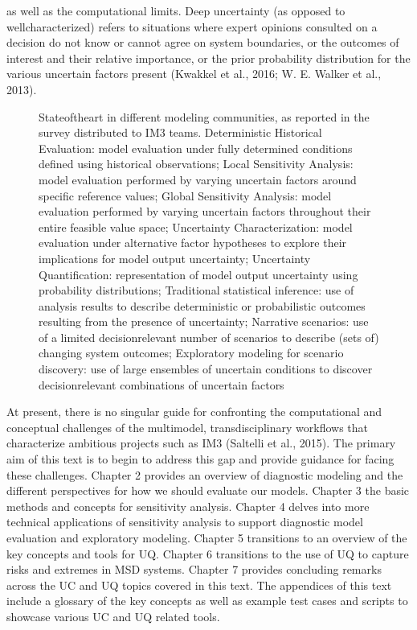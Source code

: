 \documentclass[letterpaper,10pt,english]{sphinxmanual}
\let\sphinxpxdimen\pdfpxdimen\else\newdimen\sphinxpxdimen
\begin{document}
as well as the computational limits. Deep uncertainty (as opposed to well\sphinxhyphen{}characterized) refers to situations where expert opinions consulted on a decision do not know or cannot agree on system boundaries, or the outcomes of interest and their relative importance, or the prior probability distribution for the various uncertain factors present (Kwakkel et al., 2016; W. E. Walker et al., 2013).

\begin{figure}[htbp]
\centering
\capstart

\noindent\sphinxincludegraphics[width=700\sphinxpxdimen]{{figure1_state_of_the_science}.png}
\caption{State\sphinxhyphen{}of\sphinxhyphen{}the\sphinxhyphen{}art in different modeling communities, as reported in the survey distributed to IM3 teams. Deterministic Historical Evaluation: model evaluation under fully determined conditions defined using historical observations; Local Sensitivity Analysis: model evaluation performed by varying uncertain factors around specific reference values; Global Sensitivity Analysis: model evaluation performed by varying uncertain factors throughout their entire feasible value space; Uncertainty Characterization: model evaluation under alternative factor hypotheses to explore their implications for model output uncertainty; Uncertainty Quantification: representation of model output uncertainty using probability distributions; Traditional statistical inference: use of analysis results to describe deterministic or probabilistic outcomes resulting from the presence of uncertainty; Narrative scenarios: use of a limited decision\sphinxhyphen{}relevant number of scenarios to describe (sets of) changing system outcomes; Exploratory modeling for scenario discovery: use of large ensembles of uncertain conditions to discover decision\sphinxhyphen{}relevant combinations of uncertain factors}\label{\detokenize{1_introduction:id1}}\end{figure}

\sphinxAtStartPar
At present, there is no singular guide for confronting the computational and conceptual challenges of the multi\sphinxhyphen{}model, transdisciplinary workflows that characterize ambitious projects such as IM3 (Saltelli et al., 2015). The primary aim of this text is to begin to address this gap and provide guidance for facing these challenges. Chapter 2 provides an overview of diagnostic modeling and the different perspectives for how we should evaluate our models. Chapter 3 the basic methods and concepts for sensitivity analysis. Chapter 4 delves into more technical applications of sensitivity analysis to support diagnostic model evaluation and exploratory modeling. Chapter 5 transitions to an overview of the key concepts and tools for UQ. Chapter 6 transitions to the use of UQ to capture risks and extremes in MSD systems. Chapter 7 provides concluding remarks across the UC and UQ topics covered in this text. The appendices of this text include a glossary of the key concepts as well as example test cases and scripts to showcase various UC and UQ related tools.
\end{document}
